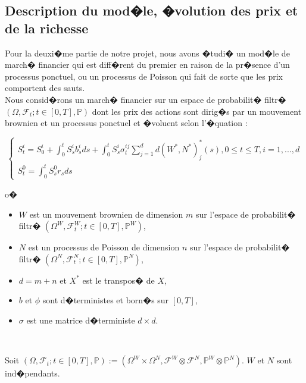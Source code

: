 \documentclass[11pt,letterpaper]{article}
\begin{document}
\subsection{Description du mod�le, �volution des prix et de la richesse}
Pour la deuxi�me partie de notre projet, nous avons �tudi� un mod�le de march� financier qui est diff�rent du premier en raison de la pr�sence d'un processus ponctuel, ou un processus de Poisson qui fait de sorte que les prix comportent des sauts.\\

Nous consid�rons un march� financier sur un espace de probabilit� filtr� $(\Omega, \mathcal{F}_t; t \in [0, T], \mathbb{P})$ dont les prix des actions sont dirig�s par un mouvement brownien et un processus ponctuel et �voluent selon l'�quation : 

\begin{equation}
\begin{cases}S_t^i = S_0^i + \int_{0}^{t}S_s^i b_s^i ds + \int_{0}^{t}S_s^i \sigma^{ij}_t \sum_{j = 1}^{d} d(W^*, N^*)^{*}_j(s), 0 \leq t \leq T, i = 1, ..., d \\
S^0_t = \int_{0}^{t} S^0_s r_s ds \end{cases}
\end{equation}

o�\\

\begin{itemize} 
\item $W$ est un mouvement brownien de dimension $m$ sur l'espace de probabilit� filtr� $(\Omega^W, \mathcal{F}^W_t; t \in [0, T], \mathbb{P}^W)$,
\item $N$ est un processus de Poisson de dimension $n$ sur l'espace de probabilit� filtr� $(\Omega^N, \mathcal{F}^N_t; t \in [0, T], \mathbb{P}^N)$,
\item $d = m+n$ et $X^*$ est le transpos� de $X$,
\item $b$ et $\phi$ sont d�terministes et born�s sur $[0, T]$,
\item $\sigma$ est une matrice d�terministe $d \times d$.
\end{itemize}
\

Soit $(\Omega, \mathcal{F}_t; t\in [0, T], \mathbb{P}) := (\Omega^W \times \Omega^N, \mathcal{F}^W \otimes \mathcal{F}^N, \mathbb{P}^W \otimes \mathbb{P}^N)$. $W$ et $N$ sont ind�pendants. \\
\end{document}
